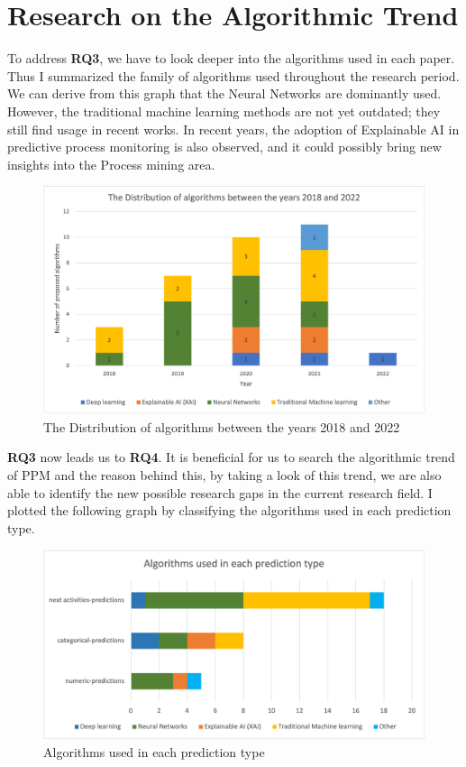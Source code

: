 \documentclass[runningheads]{llncs}
\begin{document}
		
		\section{Research on the Algorithmic Trend}
		
		To address \textbf{RQ3}, we have to look deeper into the algorithms used in each paper. Thus I summarized the family of algorithms used throughout the research period. We can derive from this graph that the Neural Networks are dominantly used. However, the traditional machine learning methods are not yet outdated; they still find usage in recent works. In recent years, the adoption of Explainable AI in predictive process monitoring is also observed, and it could possibly bring new insights into the Process mining area.       
		
		\begin{figure}
		\includegraphics[scale=0.4]{Distribution_algorithms.png}
		\centering
		\caption{The Distribution of algorithms between the years 2018 and 2022}
		\end{figure}
		
		\textbf{RQ3} now leads us to \textbf{RQ4}. It is beneficial for us to search the algorithmic trend of PPM and the reason behind this, by taking a look of this trend, we are also able to identify the new possible research gaps in the current research field. I plotted the following graph by classifying the algorithms used in each prediction type. 
		
		\begin{figure}
		\includegraphics[scale=0.6]{Algorithms_usage.png}
		\centering
		\caption{Algorithms used in each prediction type}
		\end{figure}
		
\end{document}
